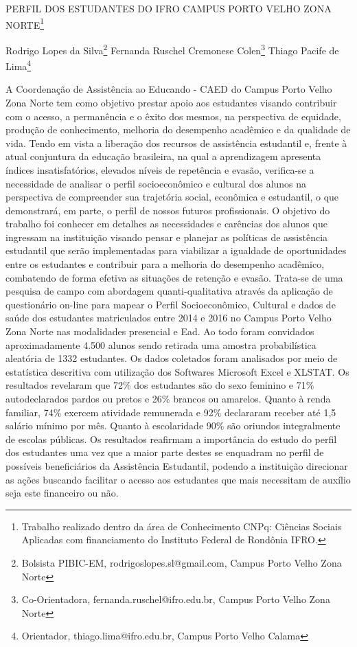 \documentclass[article,12pt,onesidea,4paper,english,brazil]{abntex2}
\begin{document}
	
	
	\frenchspacing 
	
	\begin{center}
		\LARGE PERFIL DOS ESTUDANTES DO IFRO CAMPUS PORTO VELHO ZONA NORTE\footnote{Trabalho realizado dentro da área de Conhecimento CNPq: Ciências Sociais Aplicadas com
			financiamento do Instituto Federal de Rondônia IFRO.}
		
		\normalsize
		Rodrigo Lopes da Silva\footnote{Bolsista PIBIC-EM, rodrigoslopes.sl@gmail.com, Campus Porto Velho Zona Norte} 
		Fernanda Ruschel Cremonese Colen\footnote{Co-Orientadora, fernanda.ruschel@ifro.edu.br, Campus Porto Velho Zona Norte} 
		Thiago Pacife de Lima\footnote{Orientador, thiago.lima@ifro.edu.br, Campus Porto Velho Calama} 
	
	\end{center}
	
	\noindent A Coordenação de Assistência ao Educando - CAED do Campus Porto Velho Zona
	Norte tem como objetivo prestar apoio aos estudantes visando contribuir com o
	acesso, a permanência e o êxito dos mesmos, na perspectiva de equidade,
	produção de conhecimento, melhoria do desempenho acadêmico e da qualidade de
	vida. Tendo em vista a liberação dos recursos de assistência estudantil e, frente à
	atual conjuntura da educação brasileira, na qual a aprendizagem apresenta índices
	insatisfatórios, elevados níveis de repetência e evasão, verifica-se a necessidade de
	analisar o perfil socioeconômico e cultural dos alunos na perspectiva de
	compreender sua trajetória social, econômica e estudantil, o que demonstrará, em
	parte, o perfil de nossos futuros profissionais. O objetivo do trabalho foi conhecer em
	detalhes as necessidades e carências dos alunos que ingressam na instituição
	visando pensar e planejar as políticas de assistência estudantil que serão
	implementadas para viabilizar a igualdade de oportunidades entre os estudantes e
	contribuir para a melhoria do desempenho acadêmico, combatendo de forma efetiva
	as situações de retenção e evasão. Trata-se de uma pesquisa de campo com
	abordagem quanti-qualitativa através da aplicação de questionário on-line para
	mapear o Perfil Socioeconômico, Cultural e dados de saúde dos estudantes
	matriculados entre 2014 e 2016 no Campus Porto Velho Zona Norte nas
	modalidades presencial e Ead. Ao todo foram convidados aproximadamente 4.500
	alunos sendo retirada uma amostra probabilística aleatória de 1332 estudantes. Os
	dados coletados foram analisados por meio de estatística descritiva com utilização
	dos Softwares Microsoft Excel e XLSTAT. Os resultados revelaram que 72\% dos
	estudantes são do sexo feminino e 71\% autodeclarados pardos ou pretos e 26\%
	brancos ou amarelos. Quanto à renda familiar, 74\% exercem atividade remunerada
	e 92\% declararam receber até 1,5 salário mínimo por mês. Quanto à escolaridade
	90\% são oriundos integralmente de escolas públicas. Os resultados reafirmam a
	importância do estudo do perfil dos estudantes uma vez que a maior parte destes se
	enquadram no perfil de possíveis beneficiários da Assistência Estudantil, podendo a
	instituição direcionar as ações buscando facilitar o acesso aos estudantes que mais
	necessitam de auxílio seja este financeiro ou não.
	
\end{document}
